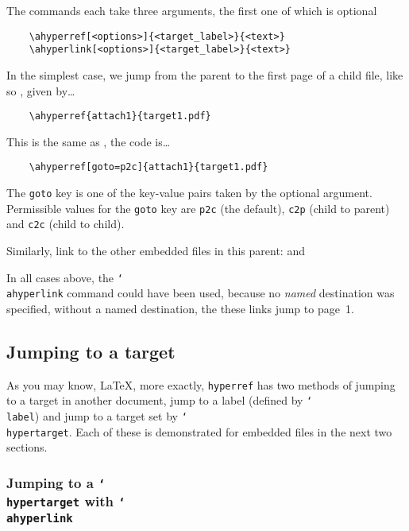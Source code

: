 \documentclass{article}
\newcommand{\cs}[1]{\texttt{\char`\\#1}}
\newcommand\newtopic{\par\ifdim\lastskip>0pt\relax\vskip-\lastskip\fi
\par\vskip6pt\noindent}
\begin{document}
\newtopic The commands each take three arguments, the
first one of which is optional
\begin{verbatim}
    \ahyperref[<options>]{<target_label>}{<text>}
    \ahyperlink[<options>]{<target_label>}{<text>}
\end{verbatim}
\noindent In the simplest case, we jump from the parent to the first page of a
child file, like so , given by\dots
\begin{verbatim}
    \ahyperref{attach1}{target1.pdf}
\end{verbatim}
This is the same as , the code is\dots
\begin{verbatim}
    \ahyperref[goto=p2c]{attach1}{target1.pdf}
\end{verbatim}
The \texttt{goto} key is one of the key-value pairs taken by the
optional argument. Permissible values for the \texttt{goto} key are
\texttt{p2c} (the default), \texttt{c2p} (child to parent) and
\texttt{c2c} (child to child).

\newtopic
{}

\newtopic Similarly, link to the other embedded files in this parent:
 and 

In all cases above, the \cs{ahyperlink} command could have been used, because no
\emph{named} destination was specified, without a named destination, the these links jump to page~1.


\subsection{Jumping to a target}\label{jump}

As you may know, {\LaTeX}, more exactly, \texttt{hyperref} has two
methods of jumping to a target in another document, jump to a label
(defined by \cs{label}) and jump to a target set by
\cs{hypertarget}. Each of these is demonstrated for embedded files
in the next two sections.

\subsubsection{Jumping to a \texorpdfstring{\protect\cs{hypertarget}}{\textbackslash hypertarget}
with \texorpdfstring{\protect\cs{ahyperlink}}{\textbackslash ahyperlink}}
\end{document}
